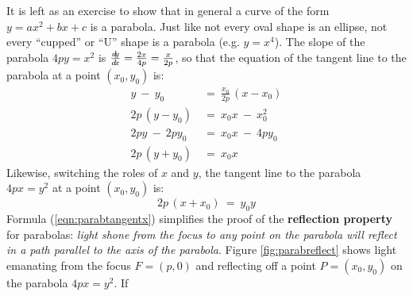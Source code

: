 It is left as an exercise to show that in general a curve of the form
$y=ax^2+bx+c$ is a parabola. Just like not every oval shape is an ellipse, not
every ``cupped'' or ``U'' shape is a parabola (e.g. $y=x^4$).
\newpage
The slope of the parabola $4py=x^2$ is $\frac{d\negmedspace y}{d\!x}=\frac{2x}{4p}=\frac{x}{2p}$, so
that the equation of the tangent line to the parabola at a point $(x_0,y_0)$ is:
\begin{align}
y ~-~ y_0 ~&=~ \frac{x_0}{2p}\,(x - x_0)\nonumber\\
2p\,(y-y_0) ~&=~ x_0x ~-~ x_0^2\nonumber\\
2py ~-~ 2py_0 ~&=~ x_0x ~-~ 4py_0\nonumber\\
2p\,(y+y_0) ~&=~ x_0x\label{eqn:parabtangenty}
\end{align}
Likewise, switching the roles of $x$ and $y$, the tangent line to the parabola
$4px=y^2$ at a point $(x_0,y_0)$ is:
\begin{equation}\label{eqn:parabtangentx}
2p\,(x+x_0) ~=~ y_0y
\end{equation}
\noindent Formula (\ref{eqn:parabtangentx}) simplifies the proof of the
\textbf{reflection property} for parabolas: \emph{light shone from the focus to
any point on the parabola will reflect in a path parallel to the axis of the
parabola}. Figure \ref{fig:parabreflect} shows light emanating from the focus
$F=(p,0)$ and reflecting off a point $P=(x_0,y_0)$ on the parabola $4px=y^2$. If
